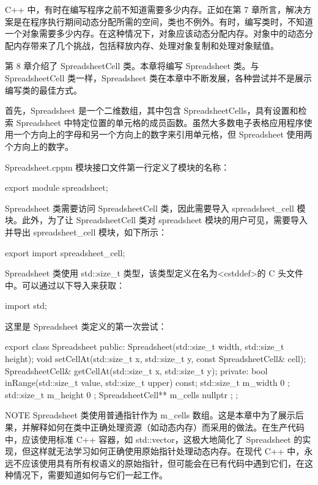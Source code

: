 
C++ 中，有时在编写程序之前不知道需要多少内存。正如在第 7 章所言，解决方案是在程序执行期间动态分配所需的空间，类也不例外。有时，编写类时，不知道一个对象需要多少内存。在这种情况下，对象应该动态分配内存。对象中的动态分配内存带来了几个挑战，包括释放内存、处理对象复制和处理对象赋值。


第 8 章介绍了 SpreadsheetCell 类。本章将编写 Spreadsheet 类。与 SpreadsheetCell 类一样，Spreadsheet 类在本章中不断发展，各种尝试并不是展示编写类的最佳方式。

首先，Spreadsheet 是一个二维数组，其中包含 SpreadsheetCells，具有设置和检索 Spreadsheet 中特定位置的单元格的成员函数。虽然大多数电子表格应用程序使用一个方向上的字母和另一个方向上的数字来引用单元格，但 Spreadsheet 使用两个方向上的数字。

Spreadsheet.cppm 模块接口文件第一行定义了模块的名称：

\begin{cpp}
export module spreadsheet;
\end{cpp}

Spreadsheet 类需要访问 SpreadsheetCell 类，因此需要导入 spreadsheet\_cell 模块。此外，为了让 SpreadsheetCell 类对 spreadsheet 模块的用户可见，需要导入并导出 spreadsheet\_cell 模块，如下所示：

\begin{cpp}
export import spreadsheet_cell;
\end{cpp}

Spreadsheet 类使用 std::size\_t 类型，该类型定义在名为<cstddef>的 C 头文件中。可以通过以下导入来获取：

\begin{cpp}
import std;
\end{cpp}

这里是 Spreadsheet 类定义的第一次尝试：

\begin{cpp}
export class Spreadsheet
{
    public:
        Spreadsheet(std::size_t width, std::size_t height);
        void setCellAt(std::size_t x, std::size_t y, const SpreadsheetCell& cell);
        SpreadsheetCell& getCellAt(std::size_t x, std::size_t y);
    private:
        bool inRange(std::size_t value, std::size_t upper) const;
        std::size_t m_width { 0 };
        std::size_t m_height { 0 };
        SpreadsheetCell** m_cells { nullptr };
};
\end{cpp}

\begin{myNotic}{NOTE}
Spreadsheet 类使用普通指针作为 m\_cells 数组。这是本章中为了展示后果，并解释如何在类中正确处理资源（如动态内存）而采用的做法。在生产代码中，应该使用标准 C++ 容器，如 std::vector，这极大地简化了 Spreadsheet 的实现，但这样就无法学习如何正确使用原始指针处理动态内存。在现代 C++ 中，永远不应该使用具有所有权语义的原始指针，但可能会在已有代码中遇到它们，在这种情况下，需要知道如何与它们一起工作。
\end{myNotic}

